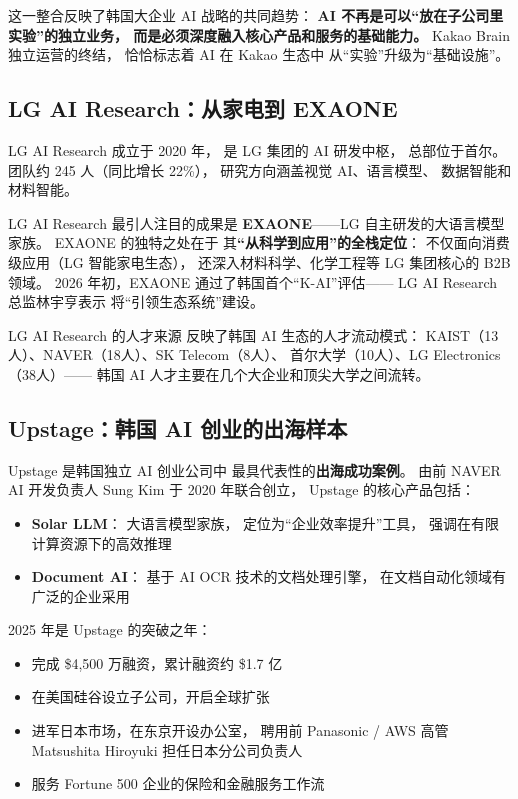 这一整合反映了韩国大企业 AI 战略的共同趋势：
\textbf{AI 不再是可以``放在子公司里实验''的独立业务，
而是必须深度融入核心产品和服务的基础能力。}
Kakao Brain 独立运营的终结，
恰恰标志着 AI 在 Kakao 生态中
从``实验''升级为``基础设施''。

\subsection{LG AI Research：从家电到 EXAONE}

LG AI Research 成立于 2020 年，
是 LG 集团的 AI 研发中枢，
总部位于首尔。
团队约 245 人（同比增长 22\%），
研究方向涵盖视觉 AI、语言模型、
数据智能和材料智能。

LG AI Research 最引人注目的成果是
\textbf{EXAONE}——LG 自主研发的大语言模型家族。
EXAONE 的独特之处在于
其\textbf{``从科学到应用''的全栈定位}：
不仅面向消费级应用（LG 智能家电生态），
还深入材料科学、化学工程等
LG 集团核心的 B2B 领域。
2026 年初，EXAONE 通过了韩国首个``K-AI''评估——
LG AI Research 总监林宇亨表示
将``引领生态系统''建设。

LG AI Research 的人才来源
反映了韩国 AI 生态的人才流动模式：
KAIST（13人）、NAVER（18人）、SK Telecom（8人）、
首尔大学（10人）、LG Electronics（38人）——
韩国 AI 人才主要在几个大企业和顶尖大学之间流转。

\subsection{Upstage：韩国 AI 创业的出海样本}

Upstage 是韩国独立 AI 创业公司中
最具代表性的\textbf{出海成功案例}。
由前 NAVER AI 开发负责人 Sung Kim
于 2020 年联合创立，
Upstage 的核心产品包括：
\begin{itemize}[noitemsep]
  \item \textbf{Solar LLM}：
        大语言模型家族，
        定位为``企业效率提升''工具，
        强调在有限计算资源下的高效推理
  \item \textbf{Document AI}：
        基于 AI OCR 技术的文档处理引擎，
        在文档自动化领域有广泛的企业采用
\end{itemize}

2025 年是 Upstage 的突破之年：
\begin{itemize}[noitemsep]
  \item 完成 \$4,500 万融资，累计融资约 \$1.7 亿
  \item 在美国硅谷设立子公司，开启全球扩张
  \item 进军日本市场，在东京开设办公室，
        聘用前 Panasonic / AWS 高管 Matsushita Hiroyuki
        担任日本分公司负责人
  \item 服务 Fortune 500 企业的保险和金融服务工作流
\end{itemize}

